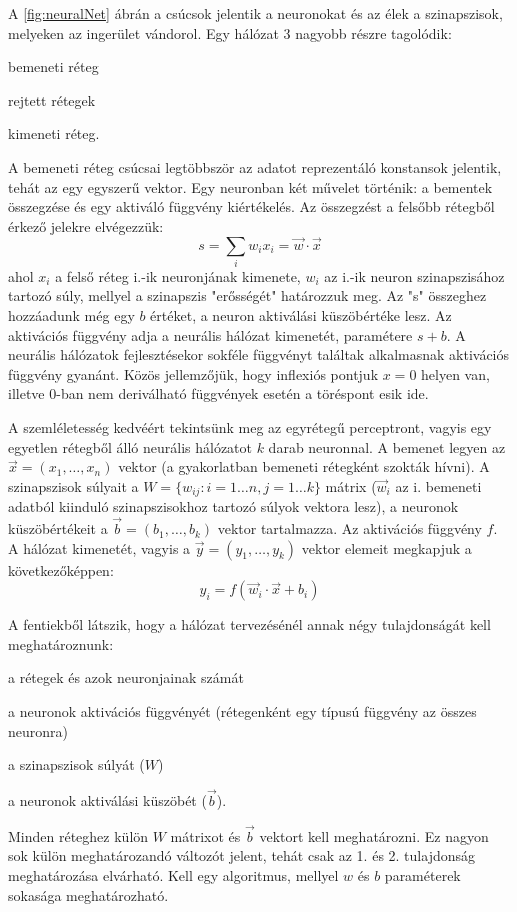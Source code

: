 A \ref{fig:neuralNet} ábrán a csúcsok jelentik a neuronokat és az élek a szinapszisok, melyeken az ingerület vándorol. Egy hálózat 3 nagyobb részre tagolódik:
\begin{enumerate*}[label={\alph*)},font=\bfseries]
	\item bemeneti réteg
	\item rejtett rétegek
	\item kimeneti réteg.
\end{enumerate*}
A bemeneti réteg csúcsai legtöbbször az adatot reprezentáló konstansok jelentik, tehát az egy egyszerű vektor.
Egy neuronban két művelet történik: a bementek összegzése és egy aktiváló függvény kiértékelés. Az összegzést a felsőbb rétegből érkező jelekre elvégezzük:
\begin{displaymath}
	s = \sum_i{w_ix_i} = \vec{w}\cdot\vec{x}
\end{displaymath}
ahol $x_i$ a felső réteg i.-ik neuronjának kimenete, $w_i$ az i.-ik neuron szinapszisához tartozó súly, mellyel a szinapszis "erősségét" határozzuk meg. Az "s" összeghez hozzáadunk még egy $b$ értéket, a neuron aktiválási küszöbértéke lesz.
Az aktivációs függvény adja a neurális hálózat kimenetét, paramétere $s+b$.
A neurális hálózatok fejlesztésekor sokféle függvényt találtak alkalmasnak aktivációs függvény gyanánt. Közös jellemzőjük, hogy inflexiós pontjuk $x=0$ helyen van, illetve 0-ban nem deriválható függvények esetén a töréspont esik ide.

A szemléletesség kedvéért tekintsünk meg az egyrétegű perceptront, vagyis egy egyetlen rétegből álló neurális hálózatot $k$ darab neuronnal. A bemenet legyen az $\vec{x}=(x_1,\dots,x_n)$ vektor (a gyakorlatban bemeneti rétegként szokták hívni). A szinapszisok súlyait a $W=\{w_{ij}:i=1\dots n,j=1\dots k\}$  mátrix ($\vec{w}_i$ az i. bemeneti adatból kiinduló szinapszisokhoz tartozó súlyok vektora lesz), a neuronok küszöbértékeit a $\vec{b}=(b_1,\dots,b_k)$ vektor tartalmazza. Az aktivációs függvény $f$. A hálózat kimenetét, vagyis a  $\vec{y}=(y_1,\dots,y_k)$ vektor elemeit megkapjuk a következőképpen:
\begin{displaymath}
	y_i = f(\vec{w}_i\cdot\vec{x}+b_i)
\end{displaymath}

A fentiekből látszik, hogy a hálózat tervezésénél annak négy tulajdonságát kell meghatároznunk:
\begin{enumerate*}
	\item a rétegek és azok neuronjainak számát
	\item a neuronok aktivációs függvényét (rétegenként egy típusú függvény az összes neuronra)
	\item a szinapszisok súlyát ($W$)
	\item a neuronok aktiválási küszöbét ($\vec{b}$).
\end{enumerate*}
Minden réteghez külön $W$ mátrixot és $\vec{b}$ vektort kell meghatározni. Ez nagyon sok külön meghatározandó változót jelent, tehát csak az 1. és 2. tulajdonság meghatározása elvárható. Kell egy algoritmus, mellyel $w$ és $b$ paraméterek sokasága meghatározható.


